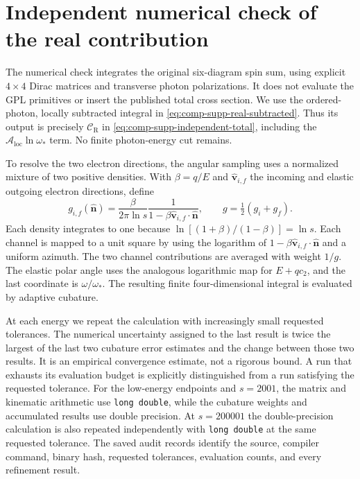 \section{Independent numerical check of the real contribution}
The numerical check integrates the original six-diagram spin sum,
using explicit $4\times4$ Dirac matrices and transverse photon
polarizations. It does not evaluate the GPL primitives or insert
the published total cross section. We use the ordered-photon,
locally subtracted integral in
\eqref{eq:comp-supp-real-subtracted}. Thus its output is precisely
$\mathcal C_{\mathrm R}$ in
\eqref{eq:comp-supp-independent-total}, including the
$\mathcal A_{\mathrm{loc}}\ln\omega_*$ term. No finite photon-energy cut remains.

To resolve the two electron directions, the angular sampling uses
a normalized mixture of two positive densities. With
$\beta=q/E$ and $\widehat{\bm v}_{i,f}$ the incoming and elastic
outgoing electron directions, define
\begin{equation}
 g_{i,f}(\widehat{\bm n})=
 \frac{\beta}{2\pi\ln s}
 \frac1{1-\beta\widehat{\bm v}_{i,f}\cdot\widehat{\bm n}},
 \qquad g=\tfrac12(g_i+g_f).
\end{equation}
Each density integrates to one because
$\ln[(1+\beta)/(1-\beta)]=\ln s$. Each channel is mapped to a
unit square by using the logarithm of
$1-\beta\widehat{\bm v}_{i,f}\cdot\widehat{\bm n}$ and a uniform
azimuth. The two channel contributions are averaged with weight
$1/g$. The elastic polar angle uses the analogous logarithmic map
for $E+qc_2$, and the last coordinate is $\omega/\omega_*$.
The resulting finite four-dimensional integral is evaluated by
adaptive cubature.

At each energy we repeat the calculation with increasingly small
requested tolerances. The numerical uncertainty assigned to the
last result is twice the largest of the last two cubature error
estimates and the change between those two results. It is an
empirical convergence estimate, not a rigorous bound. A run that
exhausts its evaluation budget is explicitly distinguished from a
run satisfying the requested tolerance. For the low-energy endpoints and $s=2001$, the matrix and
kinematic arithmetic use \texttt{long double}, while the cubature
weights and accumulated results use double precision. At $s=200001$
the double-precision calculation is also repeated independently with
\texttt{long double} at the same requested tolerance.
The saved audit records identify the source, compiler command,
binary hash, requested tolerances, evaluation counts, and every
refinement result.

